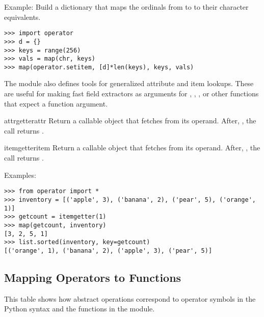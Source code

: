 Example: Build a dictionary that maps the ordinals from  to
 to their character equivalents.

\begin{verbatim}
>>> import operator
>>> d = {}
>>> keys = range(256)
>>> vals = map(chr, keys)
>>> map(operator.setitem, [d]*len(keys), keys, vals)
\end{verbatim}


The  module also defines tools for generalized attribute
and item lookups.  These are useful for making fast field extractors
as arguments for , ,
, or other functions that expect a
function argument.

\begin{funcdesc}{attrgetter}{attr}
Return a callable object that fetches  from its operand.
After, , the call  returns
.
\end{funcdesc}
    
\begin{funcdesc}{itemgetter}{item}
Return a callable object that fetches  from its operand.
After, , the call  returns
.
\end{funcdesc}

Examples:
                
\begin{verbatim}
>>> from operator import *
>>> inventory = [('apple', 3), ('banana', 2), ('pear', 5), ('orange', 1)]
>>> getcount = itemgetter(1)
>>> map(getcount, inventory)
[3, 2, 5, 1]
>>> list.sorted(inventory, key=getcount)
[('orange', 1), ('banana', 2), ('apple', 3), ('pear', 5)]
\end{verbatim}
                

\subsection{Mapping Operators to Functions \label{operator-map}}

This table shows how abstract operations correspond to operator
symbols in the Python syntax and the functions in the
 module.


